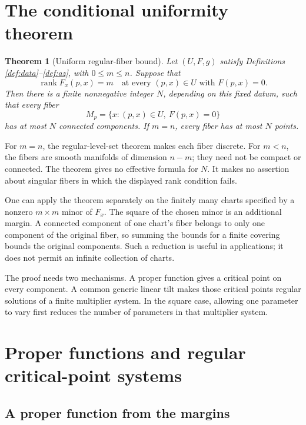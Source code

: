 \documentclass[11pt]{article}
\newtheorem{theorem}{Theorem}[section]
\theoremstyle{definition}
\theoremstyle{remark}
\newcommand{\rank}{\operatorname{rank}}
\begin{document}
\section{The conditional uniformity theorem}
\label{sec:theorem}

\begin{theorem}[Uniform regular-fiber bound]
\label{thm:uniform}
Let \((U,F,g)\) satisfy Definitions \ref{def:data}--\ref{def:az}, with
\(0\le m\le n\). Suppose that
\[
 \rank F_x(p,x)=m
 \quad\text{at every }(p,x)\in U\text{ with }F(p,x)=0.
\]
Then there is a finite nonnegative integer \(N\), depending on this
fixed datum, such that every fiber
\[
 M_p=\{x:(p,x)\in U,\ F(p,x)=0\}
\]
has at most \(N\) connected components. If \(m=n\), every fiber has
at most \(N\) points.
\end{theorem}

For \(m=n\), the regular-level-set theorem makes each fiber discrete.
For \(m<n\), the fibers are smooth manifolds of dimension \(n-m\);
they need not be compact or connected. The theorem gives no effective
formula for \(N\). It makes no assertion about singular fibers in
which the displayed rank condition fails.

One can apply the theorem separately on the finitely many charts
specified by a nonzero \(m\times m\) minor of \(F_x\). The square of
the chosen minor is an additional margin. A connected component of
one chart's fiber belongs to only one component of the original
fiber, so summing the bounds for a finite covering bounds the original
components. Such a reduction is useful in applications; it does not
permit an infinite collection of charts.

The proof needs two mechanisms. A proper function gives a critical
point on every component. A common generic linear tilt makes those
critical points regular solutions of a finite multiplier system.
In the square case, allowing one parameter to vary first reduces the
number of parameters in that multiplier system.

\section{Proper functions and regular critical-point systems}
\label{sec:tools}

\subsection{A proper function from the margins}
\end{document}
